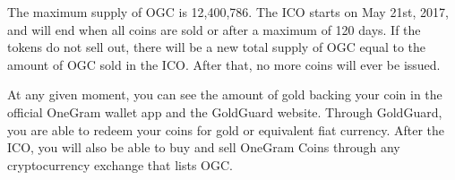 \documentclass[letterpaper,11pt]{article}
\begin{document}
The maximum supply of OGC is 12,400,786. The ICO starts on May 21st, 2017, and will end when all coins are sold or after a maximum of 120 days. If the tokens do not sell out, there will be a new total supply of OGC equal to the amount of OGC sold in the ICO. After that, no more coins will ever be issued.

At any given moment, you can see the amount of gold backing your coin in the official OneGram wallet app and the GoldGuard website. Through GoldGuard, you are able to redeem your coins for gold or equivalent fiat currency. After the ICO, you will also be able to buy and sell OneGram Coins through any cryptocurrency exchange that lists OGC.



\end{document}

